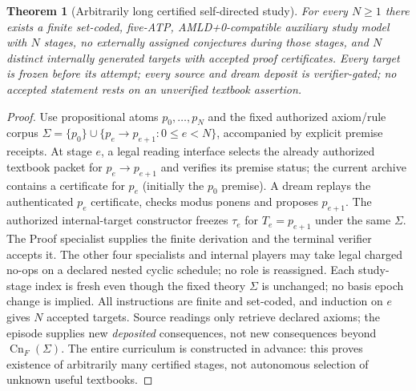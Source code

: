 \documentclass[11pt]{article}
\newtheorem{theorem}{Theorem}[section]
\newcommand{\Cn}{\operatorname{Cn}}
\begin{document}
\begin{theorem}[Arbitrarily long certified self-directed study]
For every $N\ge1$ there exists a finite set-coded, five-ATP, AMLD+0-compatible auxiliary study model with $N$ stages, no externally assigned conjectures during those stages, and $N$ distinct internally generated targets with accepted proof certificates. Every target is frozen before its attempt; every source and dream deposit is verifier-gated; no accepted statement rests on an unverified textbook assertion.
\end{theorem}
\begin{proof}
Use propositional atoms $p_0,\ldots,p_N$ and the fixed authorized axiom/rule corpus $\Sigma=\{p_0\}\cup\{p_e\to p_{e+1}:0\le e<N\}$, accompanied by explicit premise receipts. At stage $e$, a legal reading interface selects the already authorized textbook packet for $p_e\to p_{e+1}$ and verifies its premise status; the current archive contains a certificate for $p_e$ (initially the $p_0$ premise). A dream replays the authenticated $p_e$ certificate, checks modus ponens and proposes $p_{e+1}$. The authorized internal-target constructor freezes $\tau_e$ for $T_e=p_{e+1}$ under the same $\Sigma$. The Proof specialist supplies the finite derivation and the terminal verifier accepts it. The other four specialists and internal players may take legal charged no-ops on a declared nested cyclic schedule; no role is reassigned. Each study-stage index is fresh even though the fixed theory $\Sigma$ is unchanged; no basis epoch change is implied. All instructions are finite and set-coded, and induction on $e$ gives $N$ accepted targets. Source readings only retrieve declared axioms; the episode supplies new \emph{deposited} consequences, not new consequences beyond $\Cn_F(\Sigma)$. The entire curriculum is constructed in advance: this proves existence of arbitrarily many certified stages, not autonomous selection of unknown useful textbooks.\end{proof}
\end{document}
